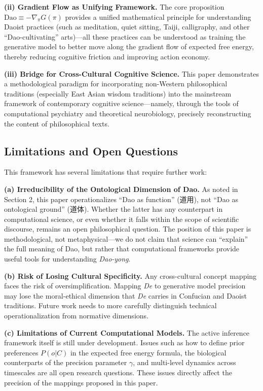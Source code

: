 \documentclass[11pt,a4paper]{article}
\begin{document}
\textbf{(ii) Gradient Flow as Unifying Framework.} The core proposition $\text{Dao} \equiv -\nabla_\pi G(\pi)$ provides a unified mathematical principle for understanding Daoist practices (such as meditation, quiet sitting, Taiji, calligraphy, and other ``Dao-cultivating'' arts)---all these practices can be understood as training the generative model to better move along the gradient flow of expected free energy, thereby reducing cognitive friction and improving action economy.

\textbf{(iii) Bridge for Cross-Cultural Cognitive Science.} This paper demonstrates a methodological paradigm for incorporating non-Western philosophical traditions (especially East Asian wisdom traditions) into the mainstream framework of contemporary cognitive science---namely, through the tools of computational psychiatry and theoretical neurobiology, precisely reconstructing the content of philosophical texts.

\subsection{Limitations and Open Questions}

This framework has several limitations that require further work:

\textbf{(a) Irreducibility of the Ontological Dimension of Dao.} As noted in Section 2, this paper operationalizes ``Dao as function'' (道用), not ``Dao as ontological ground'' (道体). Whether the latter has any counterpart in computational science, or even whether it falls within the scope of scientific discourse, remains an open philosophical question. The position of this paper is methodological, not metaphysical---we do not claim that science can ``explain'' the full meaning of Dao, but rather that computational frameworks provide useful tools for understanding \textit{Dao-yong}.

\textbf{(b) Risk of Losing Cultural Specificity.} Any cross-cultural concept mapping faces the risk of oversimplification. Mapping \textit{De} to generative model precision may lose the moral-ethical dimension that \textit{De} carries in Confucian and Daoist traditions. Future work needs to more carefully distinguish technical operationalization from normative dimensions.

\textbf{(c) Limitations of Current Computational Models.} The active inference framework itself is still under development. Issues such as how to define prior preferences $P(o|C)$ in the expected free energy formula, the biological counterparts of the precision parameter $\gamma$, and multi-level dynamics across timescales are all open research questions. These issues directly affect the precision of the mappings proposed in this paper.
\end{document}
